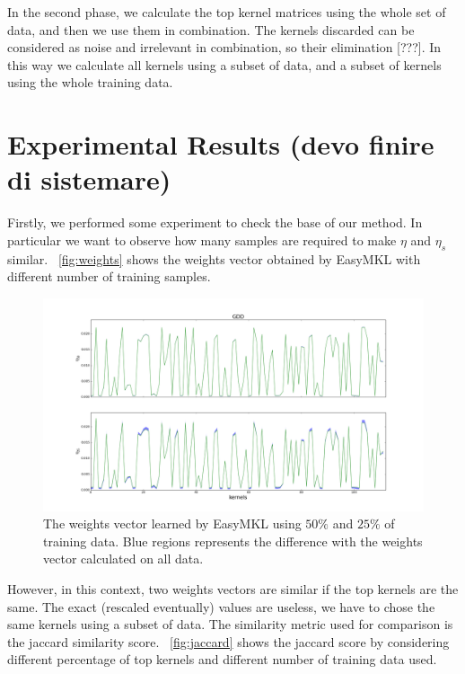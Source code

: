 \documentclass{esannV2}
\newcommand{\1}{{\bf 1}}
\begin{document}
In the second phase, we calculate the top kernel matrices using the whole set of data, and then we use them in combination. The kernels discarded can be considered as noise and irrelevant in combination, so their elimination [???].
In this way we calculate all kernels using a subset of data, and a subset of kernels using the whole training data.


\section{Experimental Results (devo finire di sistemare)}
Firstly, we performed some experiment to check the base of our method. In particular we want to observe how many samples are required to make $\eta$ and $\eta_s$ similar.
\figurename\ \ref{fig:weights} shows the weights vector obtained by EasyMKL with different number of training samples.

\begin{figure}[ħtb]
\includegraphics[width=\textwidth]{img/weights_GDD.png}
\caption{The weights vector learned by EasyMKL using $50\%$ and $25\%$ of training data. Blue regions represents the difference with the weights vector calculated on all data. }
\label{weights}
\end{figure}

However, in this context, two weights vectors are similar if the top kernels are the same. The exact (rescaled eventually) values are useless, we have to chose the same kernels using a subset of data.
The similarity metric used for comparison is the jaccard similarity score.
\figurename\ \ref{fig:jaccard} shows the jaccard score by considering different percentage of top kernels and different number of training data used.
\end{document}
